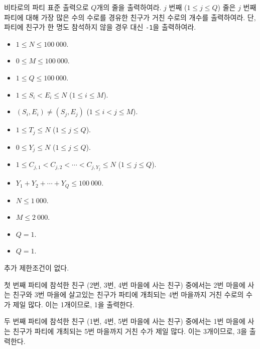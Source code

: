 \begin{problem}{비타로의 파티}
	표준 출력으로 $Q$개의 줄을 출력하여라. $j$ 번째 ($1 \le j \le Q$) 줄은 $j$ 번째 파티에 대해 가장 많은 수의 수로를 경유한 친구가 거친 수로의 개수를 출력하여라. 단, 파티에 친구가 한 명도 참석하지 않을 경우 대신 \texttt{-1}을 출력하여라.
		
	\Constraints
	
	\begin{itemize}
		\item $1 \le N \le 100\ 000$.
		\item $0 \le M \le 100\ 000$.
		\item $1 \le Q \le 100\ 000$.
		\item $1 \le S_i < E_i \le N$ ($1 \le i \le M$).
		\item $(S_i, E_i) \ne (S_j, E_j)$ ($1 \le i < j \le M$).
		\item $1 \le T_j \le N$ ($1 \le j \le Q$).
		\item $0 \le Y_j \le N$ ($1 \le j \le Q$).
		\item $1 \le C_{j, 1} < C_{j, 2}< \cdots < C_{j, Y_j} \le N$ ($1 \le j \le Q$).
		\item $Y_1 + Y_2 + \cdots + Y_Q \le 100\ 000$.
	\end{itemize}
	
	
	\begin{itemize}
		\item $N \le 1\ 000$.
		\item $M \le 2\ 000$.
		\item $Q=1$.
	\end{itemize}

	\begin{itemize}
		\item $Q=1$.
	\end{itemize}


	추가 제한조건이 없다.
	
	\Examples
	
	\begin{example}
	\end{example}
	
	첫 번째 파티에 참석한 친구 (2번, 3번, 4번 마을에 사는 친구) 중에서는 2번 마을에 사는 친구와 3번 마을에 살고있는 친구가 파티에 개최되는 4번 마을까지 거친 수로의 수가 제일 많다. 이는 1개이므로, 1을 출력한다.
	
	두 번째 파티에 참석한 친구 (1번, 4번, 5번 마을에 사는 친구) 중에서는 1번 마을에 사는 친구가 파티에 개최되는 5번 마을까지 거친 수가 제일 많다. 이는 3개이므로, 3을 출력한다.
	

\end{problem}
